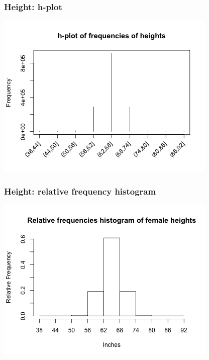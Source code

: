 \documentclass[slidestop,compress,mathserif,12pt,t,professionalfonts,xcolor=table]{beamer}
\begin{document}
\begin{frame}
  \frametitle{Height: h-plot}

  \begin{center}
    \includegraphics[scale=0.7]{figures/frequency-hplot-6.png}
    \end{center}

\end{frame}

\begin{frame}
  \frametitle{Height: relative frequency histogram}

  \begin{center}
    \includegraphics[scale=0.7]{figures/relfreq-histogram-6.png}
    \end{center}

\end{frame}
\end{document}
